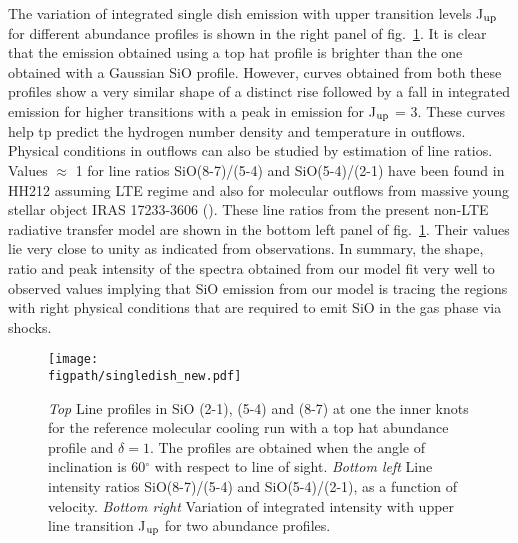 \documentclass[useAMS,usenatbib]{mn2e}
\newcommand{\figpath}{/Users/bhargavvaidya/MyProject/work/Leeds_Uni/SiOJets_New/PAPER/PFIGS/}
\begin{document}
The variation of integrated single dish emission with upper transition
levels J$_{\rm up}$ for different abundance profiles is shown in the
right panel of fig.~\ref{fig:lineratio}. It is clear that the emission
obtained using a top hat profile is brighter than the one obtained
with a Gaussian SiO profile. However, curves obtained from
both these profiles show a very similar shape of a distinct rise followed by a fall in
integrated emission for higher transitions with a peak in
emission for J$_{\rm up}$ = 3. These curves help tp predict the
hydrogen number density and temperature in outflows. Physical
conditions in outflows can also be studied by estimation of line ratios.
Values $\approx$ 1 for line ratios SiO(8-7)/(5-4) and SiO(5-4)/(2-1) have been
found in HH212 assuming LTE regime \citep{Cabrit:2007p13804,
  Lee:2008p13697} and also for molecular outflows from massive
young stellar object IRAS 17233-3606 (\citealt{Leurini:2013p13165}).
These line ratios from the present
non-LTE radiative transfer model are shown in the bottom left panel of
fig.~\ref{fig:lineratio}. Their values lie very close to unity as
indicated from observations. 
In summary, the shape, ratio and peak intensity of the spectra
obtained from our model fit very well to observed values implying
that SiO emission from our model is tracing the regions with right physical
conditions that are required to emit SiO in the gas phase via shocks. 

\begin{figure*}
 \texttt{[image: \\figpath/singledish\_new.pdf]}%
 \caption{{\em{Top}} Line profiles in SiO (2-1), (5-4) and (8-7) at one
   the inner knots for the reference molecular cooling run with a top
   hat abundance profile and $\delta = 1$. The profiles are
   obtained when the angle of inclination is 60$^{\circ}$ with respect
 to line of sight. {\em{Bottom left}} Line intensity ratios SiO(8-7)/(5-4)
and SiO(5-4)/(2-1), as a function of velocity. {\em{Bottom right}}
Variation of integrated intensity with upper line transition J$_{\rm
  up}$ for two abundance profiles.}
\label{fig:lineratio}
\end{figure*}
\end{document}
